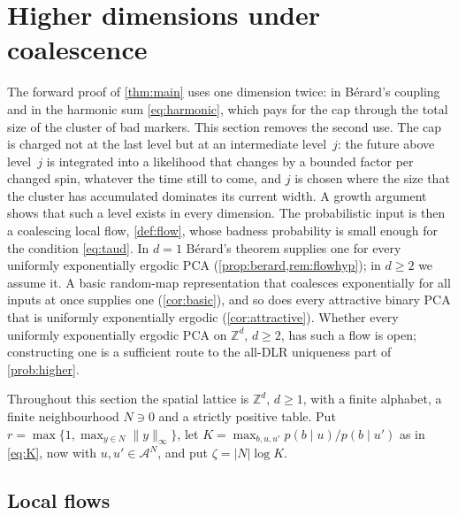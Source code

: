 \documentclass[11pt]{article}
\theoremstyle{plain}
\theoremstyle{definition}
\theoremstyle{remark}
\newcommand{\A}{\mathcal{A}}
\newcommand{\Z}{\mathbb{Z}}
\begin{document}
\section{Higher dimensions under coalescence}
\label{sec:higher}

The forward proof of \cref{thm:main} uses one dimension twice: in B\'erard's coupling and in the harmonic sum \eqref{eq:harmonic}, which pays for the cap through the total size of the cluster of bad markers. This section removes the second use. The cap is charged not at the last level but at an intermediate level~$j$: the future above level~$j$ is integrated into a likelihood that changes by a bounded factor per changed spin, whatever the time still to come, and $j$ is chosen where the size that the cluster has accumulated dominates its current width. A growth argument shows that such a level exists in every dimension. The probabilistic input is then a coalescing local flow, \cref{def:flow}, whose badness probability is small enough for the condition \eqref{eq:taud}. In $d=1$ B\'erard's theorem supplies one for every uniformly exponentially ergodic PCA (\cref{prop:berard,rem:flowhyp}); in $d\ge2$ we assume it. A basic random-map representation that coalesces exponentially for all inputs at once supplies one (\cref{cor:basic}), and so does every attractive binary PCA that is uniformly exponentially ergodic (\cref{cor:attractive}). Whether every uniformly exponentially ergodic PCA on $\Z^d$, $d\ge2$, has such a flow is open; constructing one is a sufficient route to the all-DLR uniqueness part of \cref{prob:higher}.

Throughout this section the spatial lattice is $\Z^d$, $d\ge1$, with a finite alphabet, a finite neighbourhood $N\ni0$ and a strictly positive table. Put $r=\max\{1,\max_{y\in N}\|y\|_\infty\}$, let $K=\max_{b,u,u'}p(b\mid u)/p(b\mid u')$ as in \eqref{eq:K}, now with $u,u'\in\A^N$, and put $\zeta=|N|\log K$.

\subsection{Local flows}
\end{document}
